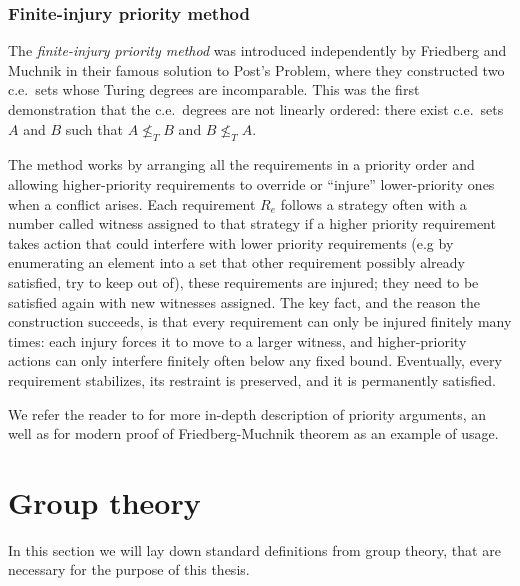 \documentclass{pracalicmgr2025}
\theoremstyle{plain}            %
\theoremstyle{remark}           %
\theoremstyle{definition}       %
\begin{document}
\subsubsection{Finite-injury priority method} \label{finit inj}
The \textit{finite-injury priority method} was introduced independently by Friedberg \cite{Friedberg1944} and Muchnik \cite{muchnik1956negative} in their famous solution to Post’s Problem, where they constructed two c.e.\ sets whose Turing degrees are incomparable. This was the first demonstration that the c.e.\ degrees are not linearly ordered: there exist c.e.\ sets $A$ and $B$ such that $A\nleq_T B$ and $B\nleq_T A$. 

The method works by arranging all the requirements in a priority order and allowing higher-priority requirements to override or “injure” lower-priority ones when a conflict arises. Each requirement $R_e$ follows a strategy often with a number called witness assigned to that strategy if a higher priority requirement takes action that could interfere with lower priority requirements (e.g by enumerating an element into a set that other requirement possibly already satisfied, try to keep out of), these requirements are injured; they need to be satisfied again with new witnesses assigned. The key fact, and the reason the construction succeeds, is that every requirement can only be injured finitely many times: each injury forces it to move to a larger witness, and higher-priority actions can only interfere finitely often below any fixed bound. Eventually, every requirement stabilizes, its restraint is preserved, and it is permanently satisfied. 

We refer the reader to \cite{lempp2012priority} for more in-depth description of priority arguments, an well as for modern proof of Friedberg-Muchnik theorem as an example of usage.  

\section{Group theory}
In this section we will lay down standard definitions from group theory, that are necessary for the purpose of this thesis. 
\end{document}
